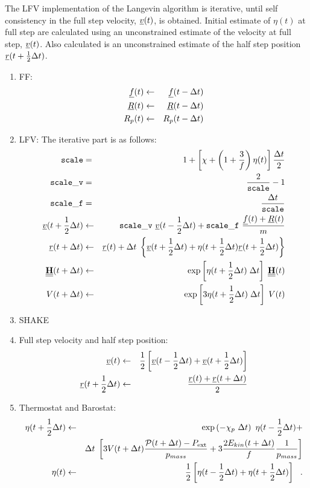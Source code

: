 The LFV implementation of the Langevin algorithm is iterative,
until self consistency in the full step velocity, $\mbox{$\underline{v}$}(t)$,
is obtained.  Initial estimate of $\eta (t)$ at
full step are calculated using an unconstrained estimate of the
velocity at full step, $\mbox{$\underline{v}$}(t)$.  Also calculated is an unconstrained
estimate of the half step position $\mbox{$\underline{r}$}(t + {1 \over 2} \Delta t)$.
\begin{enumerate}
\item FF:
\begin{eqnarray}
\mbox{$\underline{f}$}(t) &\leftarrow& \mbox{$\underline{f}$}(t - \Delta t) \nonumber \\
\mbox{$\underline{R}$}(t) &\leftarrow& \mbox{$\underline{R}$}(t - \Delta t) \\
R_{p} (t) &\leftarrow& R_{p} (t - \Delta t) \nonumber
\end{eqnarray}
\item LFV: The iterative part is as follows:
\begin{eqnarray}
{\tt scale} &=& 1 + \left[ \chi + \left(1+\frac{3}{f}\right) \eta (t) \right] \frac{\Delta t}{2} \nonumber \\
{\tt scale\_v} &=& \frac{2}{\tt scale}-1 \nonumber \\
{\tt scale\_f} &=& \frac{\Delta t}{\tt scale} \nonumber \\
\mbox{$\underline{v}$}(t + {1 \over 2} \Delta t) &\leftarrow&
{\tt scale\_v}~\mbox{$\underline{v}$}(t - {1 \over 2} \Delta t) +
{\tt scale\_f}~\frac{\mbox{$\underline{f}$}(t) + \mbox{$\underline{R}$}(t)}{m} \nonumber \\
\mbox{$\underline{r}$}(t + \Delta t) &\leftarrow& \mbox{$\underline{r}$}(t) + \Delta t \;
\left\{ \mbox{$\underline{v}$}(t + {1 \over 2} \Delta t) + \eta (t + {1 \over 2} \Delta t)
\mbox{$\underline{r}$}(t + {1 \over 2} \Delta t) \right\} \\
\mbox{$\underline{\underline{\bf H}}$}(t + \Delta t) &\leftarrow& \exp \left[ \eta (t + {1 \over 2} \Delta t) \;
\Delta t \right] \; \mbox{$\underline{\underline{\bf H}}$}(t) \nonumber \\
V(t + \Delta t) &\leftarrow& \exp \left[3 \eta (t + {1 \over 2} \Delta t) \;
\Delta t \right] \; V(t) \nonumber
\end{eqnarray}
\item SHAKE \item Full step velocity and half step position:
\begin{eqnarray}
\mbox{$\underline{v}$}(t) &\leftarrow& {1 \over 2} \left[ \mbox{$\underline{v}$}(t - {1 \over 2} \Delta t) +
\mbox{$\underline{v}$}(t + {1 \over 2} \Delta t) \right] \nonumber \\
\mbox{$\underline{r}$}(t + {1 \over 2} \Delta t) &\leftarrow& \frac{\mbox{$\underline{r}$}(t) + \mbox{$\underline{r}$}(t + \Delta t)}{2}
\end{eqnarray}
\item Thermostat and Barostat:
\begin{eqnarray}
\eta (t + {1 \over 2} \Delta t) &\leftarrow& \exp \left( -\chi_{p}~\Delta t \right) ~
\eta (t - {1 \over 2} \Delta t) + \nonumber \\
&& \Delta t \; \left[ 3 V(t + \Delta t) \frac{{\cal P}(t + \Delta t) - P_{\rm ext}}{p_{mass}} +
3 \frac{2 E_{kin}(t + \Delta t)}{f} \frac{1}{p_{mass}} \right] \\
\eta (t) &\leftarrow& {1 \over 2} \left[ \eta (t - {1 \over 2} \Delta t) +
\eta (t + {1 \over 2} \Delta t) \right]~~. \nonumber
\end{eqnarray}
\end{enumerate}
